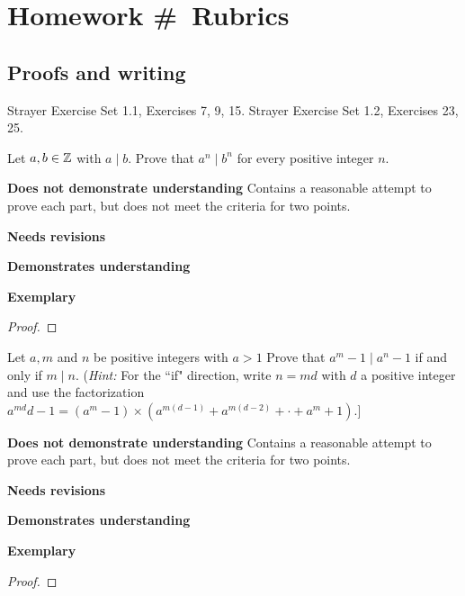 \documentclass[letterpaper, 11pt]{../ximera}
\begin{document}
\chapter{Homework \#\homework\ Rubrics}

\section*{Proofs and writing}  %
Strayer Exercise Set 1.1, Exercises 7, 9, 15. Strayer Exercise Set 1.2, Exercises 23, 25. 
\begin{ex}
 Let $a, b \in\mathbb Z$ with $a\mid b$. Prove that $a^n\mid b^n$ for every positive integer $n$.
\end{ex}

\begin{writeRubric}
    \item \textbf{Does not demonstrate understanding}
     Contains a reasonable attempt to prove each part, but does not meet the criteria for two points.
    \item \textbf{Needs revisions}
     
    \item \textbf{Demonstrates understanding}
    
    \item \textbf{Exemplary}
        
\end{writeRubric}
                                       \begin{proof}
 
\end{proof}

\begin{ex}
 Let $a, m$ and $n$ be positive integers with $a >1$ Prove that $a^m-1\mid a^n-1$ if and only if $m\mid n.$ (\emph{Hint:} For the ``if" direction, write $n= md$ with $d$ a positive integer and use the factorization $a^{md} d - 1= (a^m - 1) \times  (a^{m(d-1)} + a^{m(d-2)} +\cdot + a^m + 1).$]
\end{ex}

\begin{writeRubric}
    \item \textbf{Does not demonstrate understanding}
     Contains a reasonable attempt to prove each part, but does not meet the criteria for two points.
    \item \textbf{Needs revisions}
     
    \item \textbf{Demonstrates understanding}
    
    \item \textbf{Exemplary}
        
\end{writeRubric}
                                       \begin{proof}
 
\end{proof}
\end{document}
